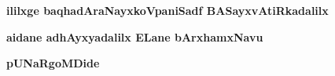 



\begin{center}
{\bf ililxge baqhadAraNayxkoVpaniSadf BASayxvAtiRkadalilx}
\smallskip

{\bf aidane adhAyxyadalilx ELane bArxhamxNavu}
\smallskip

{\bf pUNaRgoMDide}
\end{center}
